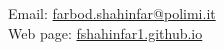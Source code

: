{ %
\noindent
Email: \href{mailto:farbod.shahinfar@polimi.it}{farbod.shahinfar@polimi.it} \\
Web page: \href{https://fshahinfar1.github.io}{fshahinfar1.github.io} \\
}
